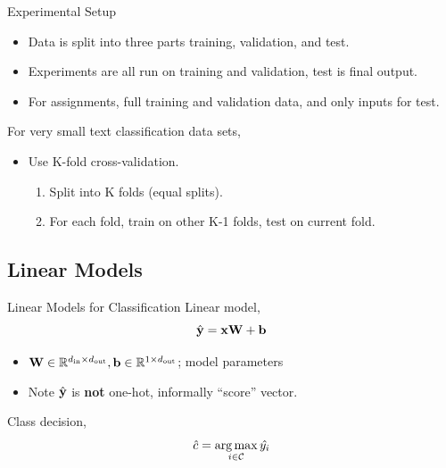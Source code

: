 \documentclass{beamer}
\begin{document}
\begin{frame}{Experimental Setup}
  
  \begin{itemize}
  \item Data is split into three parts training, validation, and test.
  \item Experiments are all run on training and validation, test is final output.

  \item For assignments, full training and validation data, and only inputs for test.
  \end{itemize}
  
  For very small text classification data sets,
  \begin{itemize}
  \item Use K-fold cross-validation. 
    \begin{enumerate}
    \item Split into K folds (equal splits).
    \item For each fold, train on other K-1 folds, test on current fold. 
    \end{enumerate}
  \end{itemize}
\end{frame}

\subsection{Linear Models}

\begin{frame}{Linear Models for Classification}
  Linear model,
  \[\hat{\mathbf{y}} = \mathbf{x} \mathbf{W} + \mathbf{b}\]    
  \begin{itemize}
  \item $\mathbf{W} \in \mathbb{R}^{{d_{\mathrm{in}}} \times {d_{\mathrm{out}}}}, \mathbf{b} \in \mathbb{R}^{1 \times {d_{\mathrm{out}}}}$; model parameters
  \item Note $\hat{\mathbf{y}}$ is \textbf{not} one-hot, informally ``score'' vector. 
  \end{itemize}

  \air 

  Class decision,
  \[ \hat{c} = \argmax_{i \in \mcC} \hat{y_i} \]
\end{frame}
\end{document}
